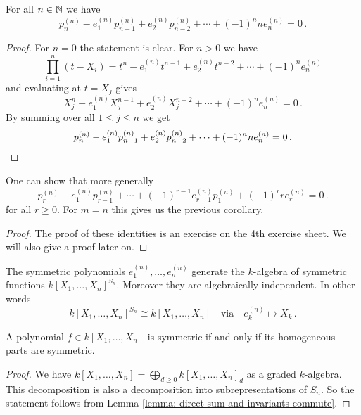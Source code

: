 \begin{corollary}
  For all $n \in \mathbb{N}$ we have
  \[
      p^{(n)}_n - e^{(n)}_1 p^{(n)}_{n-1} + e^{(n)}_2 p^{(n)}_{n-2} + \dotsb + (-1)^n n e^{(n)}_n
    = 0 \,.
  \]
\end{corollary}
\begin{proof}
  For $n = 0$ the statement is clear. For $n > 0$ we have
  \[
      \prod_{i=1}^n (t-X_i)
    = t^n - e^{(n)}_1 t^{n-1} + e^{(n)}_2 t^{n-2} + \dotsb + (-1)^n e^{(n)}_n
  \]
  and evaluating at $t = X_j$ gives
  \[
      X_j^n - e^{(n)}_1 X_j^{n-1} + e^{(n)}_2 X_j^{n-2} + \dotsb + (-1)^n e^{(n)}_n
    = 0 \,.
  \]
  By summing over all $1 \leq j \leq n$ we get
  \[
      p^{(n)}_n - e^{(n)}_1 p^{(n)}_{n-1} + e^{(n)}_2 p^{(n)}_{n-2} + \dotsb + (-1)^n n e^{(n)}_n
    = 0 \,.
    \qedhere
  \]
\end{proof}


\begin{remark}
  One can show that more generally
  \[
      p^{(n)}_r - e^{(n)}_1 p^{(n)}_{r-1} + \dotsb + (-1)^{r-1} e^{(n)}_{r-1} p^{(n)}_1 + (-1)^r r e^{(n)}_r
    = 0 \,.
  \]
  for all $r \geq 0$.
  For $m = n$ this gives us the previous corollary.
\end{remark}
\begin{proof}
  The proof of these identities is an exercise on the 4th exercise sheet.
  We will also give a proof later on.
\end{proof}


\begin{theorem}
  The symmetric polynomials $e^{(n)}_1, \dotsc, e^{(n)}_n$ generate the $k$-algebra of symmetric functions $k[X_1, \dotsc, X_n]^{S_n}$.
  Moreover they are algebraically independent.
  In other words
  \[
            k[X_1, \dotsc, X_n]^{S_n}
    \cong   k[X_1, \dotsc, X_n]
    \quad\text{via}\quad
            e^{(n)}_k
    \mapsto X_k \,.
  \]
\end{theorem}


\begin{lemma}
  A polynomial $f \in k[X_1, \dotsc, X_n]$ is symmetric if and only if its homogeneous parts are symmetric.
\end{lemma}
\begin{proof}
  We have $k[X_1, \dotsc, X_n] = \bigoplus_{d \geq 0} k[X_1, \dotsc, X_n]_d$ as a graded $k$-algebra.
  This decomposition is also a decomposition into subrepresentations of $S_n$.
  So the statement follows from Lemma \ref{lemma: direct sum and invariants commute}.
\end{proof}


